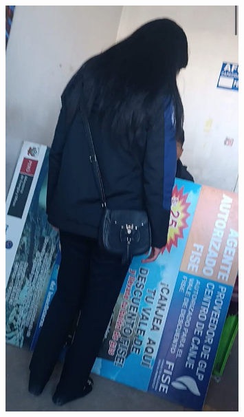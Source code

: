 \documentclass[11pt, a4paper]{article}
\begin{document}
\begin{figure}[H]
\centering
\includegraphics[width=0.8\textwidth]{evidencia2.png}
\end{figure}
\end{document}
